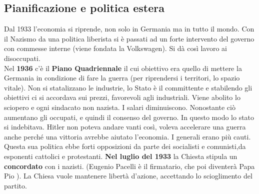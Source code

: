 \subsection{Pianificazione e politica estera}
Dal 1933 l'economia si riprende, non solo in Germania ma in tutto il mondo. Con il Nazismo da una
politica liberista si è passati ad un forte intervento del governo con commesse interne (viene
fondata la Volkswagen). Si dà così lavoro ai disoccupati.\\
Nel \textbf{1936} c'è il \textbf{Piano Quadriennale} il cui obiettivo era quello di mettere la 
Germania in condizione di fare la guerra (per riprendersi i territori, lo spazio vitale). Non si
statalizzano le industrie, lo Stato è il committente e stabilendo gli obiettivi ci si accordava sui
prezzi, favorevoli agli industriali. Viene abolito lo sciopero e ogni sindacato non nazista. I salari
diminuiscono. Nonostante ciò aumentano gli occupati, e quindi il consenso del governo. In questo modo
lo stato si indebitava. Hitler non poteva andare vanti così, voleva accelerare una guerra anche
perché una vittoria avrebbe aiutato l'economia. I generali erano più cauti.\\
Questa sua politica ebbe forti opposizioni da parte dei socialisti e comunisti,da esponenti cattolici
e protestanti. \textbf{Nel luglio del 1933} la Chiesta stipula un \textbf{concordato} con i nazisti.
(Eugenio Pacelli è il firmatario, che poi diventerà Papa Pio ). La Chiesa vuole mantenere 
libertà d'azione, accettando lo scioglimento del partito.

